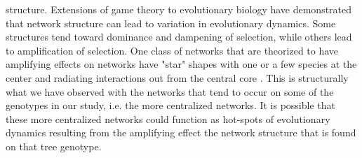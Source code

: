 \documentclass[fleqn,12pt]{olplainarticle}
\begin{document}
structure. Extensions of game theory to evolutionary biology have
demonstrated that network structure can lead to variation in
evolutionary dynamics. Some structures tend toward dominance and
dampening of selection, while others lead to amplification of
selection. One class of networks that are theorized to have amplifying
effects on networks have "star" shapes with one or a few species at
the center and radiating interactions out from the central core
\cite{Lleberman2005EvolutionaryGraphs}. This is structurally what we
have observed with the networks that tend to occur on some of the
genotypes in our study, i.e. the more centralized networks. It is
possible that these more centralized networks could function as
hot-spots of evolutionary dynamics resulting from the amplifying
effect the network structure that is found on that tree genotype.
\end{document}
